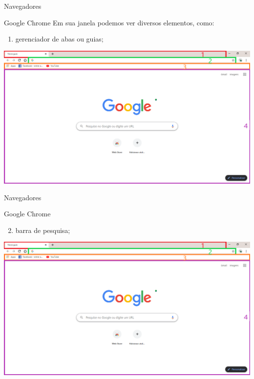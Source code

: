 \begin{frame}{Navegadores}
	\begin{block}{Google Chrome}
		Em sua janela podemos ver diversos elementos, como:
		\begin{enumerate}
			\item gerenciador de abas ou guias;
		\end{enumerate}
	\end{block}
	
	\centering
	\includegraphics[width=0.8\linewidth]{Figuras/Ch03/fig8.6}
\end{frame}


\begin{frame}{Navegadores}
	\begin{block}{Google Chrome}
		\begin{enumerate}
			\setcounter{enumi}{1}
			\item barra de pesquisa;
		\end{enumerate}
	\end{block}
	
	\centering
	\includegraphics[width=0.9\linewidth]{Figuras/Ch03/fig8.6}
\end{frame}


